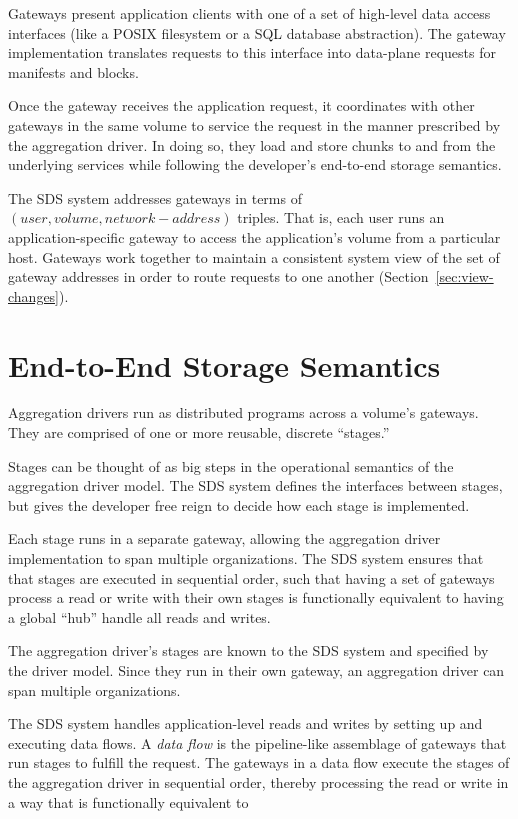 Gateways present application clients with one of a set of high-level data access
interfaces (like a POSIX filesystem or a SQL database abstraction).
The gateway implementation translates requests to this interface
into data-plane requests for manifests and blocks.

Once the gateway receives the application request, it coordinates with other
gateways in the same volume to service the request in the manner prescribed by
the aggregation driver.  In doing so, they load and store chunks to and from the
underlying services while following the developer's end-to-end storage
semantics.

The SDS system addresses gateways in terms of $(user, volume, network-address)$
triples.  That is, each user runs an application-specific gateway to access the
application's volume from a particular host.  Gateways work together to maintain
a consistent system view of the set of gateway addresses in order to route
requests to one another (Section~\ref{sec:view-changes}).

\section{End-to-End Storage Semantics}
\label{sec:aggregation-driver-model}

Aggregation drivers run as distributed programs across a volume's gateways.
They are comprised of one or more reusable, discrete ``stages.''

Stages can be thought of as big steps in the operational semantics of the
aggregation driver model.  The SDS system defines the interfaces between stages,
but gives the developer free reign to decide how each stage is implemented.

Each stage runs in a separate gateway, allowing the aggregation driver
implementation to span multiple organizations.  The SDS system ensures that that
stages are executed in sequential order, such that having a set of gateways
process a read or write with their own stages is functionally equivalent to
having a global ``hub'' handle all reads and writes.

The aggregation driver's stages are known to the SDS system and specified by the
driver model.  Since they run in their own gateway, an aggregation driver can
span multiple organizations.

The SDS system handles application-level reads and writes by setting up and
executing data flows.  A \emph{data flow} is the pipeline-like assemblage of gateways
that run stages to fulfill the request.  The gateways in a data flow execute the
stages of the aggregation driver in sequential order, thereby processing the
read or write in a way that is functionally equivalent to 

